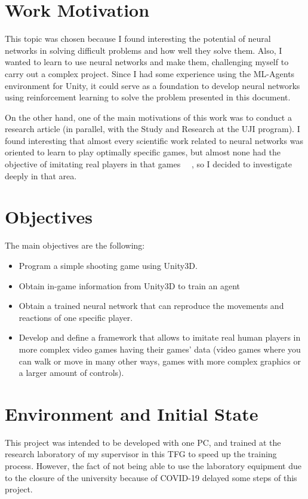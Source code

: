 \section{Work Motivation}

This topic was chosen because I found interesting the potential of neural networks in solving difficult problems and how well they solve them. Also, I wanted to learn to use neural networks and make them, challenging myself to carry out a complex project. Since I had some experience using the ML-Agents environment for Unity, it could serve as a foundation to develop neural networks using reinforcement learning to solve the problem presented in this document.

On the other hand, one of the main motivations of this work was to conduct a research article (in parallel, with the Study and Research at the UJI program). I found interesting that almost every scientific work related to neural networks was oriented to learn to play optimally specific games, but almost none had the objective of imitating real players in that games ~\cite{livingstone}~\cite{nakano}, so I decided to investigate deeply in that area.

\section{Objectives}

The main objectives are the following:
\begin{itemize}
 \item Program a simple shooting game using Unity3D.
 \item Obtain in-game information from Unity3D to train an agent
 \item Obtain a trained neural network that can reproduce the movements and reactions of one specific player.
 \item Develop and define a framework that allows to imitate real human players in more complex video games having their games’ data (video games where you can walk or move in many other ways, games with more complex graphics or a larger amount of controls).
\end{itemize}

\section{Environment and Initial State}
\label{sec:initialstate}

This project was intended to be developed with one PC, and trained at the research laboratory of my supervisor in this TFG to speed up the training process. However, the fact of not being able to use the laboratory equipment due to the closure of the university because of COVID-19 delayed some steps of this project.
